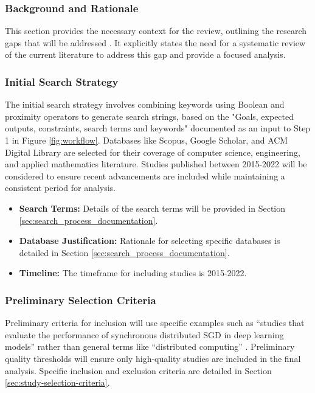 \subsubsection{Background and Rationale}
This section provides the necessary context for the review, outlining the research gaps that will
be addressed \cite{ben-nun_demystifying_2020}. It explicitly states the need for a systematic
review of the current literature to address this gap and provide a focused analysis.

\subsubsection{Initial Search Strategy}
The initial search strategy involves combining keywords using Boolean and proximity operators to
generate search strings, based on the "Goals, expected outputs, constraints, search terms and
keywords" documented as an input to Step 1 in Figure \ref{fig:workflow}. Databases like Scopus,
Google Scholar, and ACM Digital Library are selected for their coverage of computer science,
engineering, and applied mathematics literature. Studies published between 2015-2022 will be
considered to ensure recent advancements are included while maintaining a consistent period for
analysis.
\begin{itemize}
	\item \textbf{Search Terms:} Details of the search terms will be provided in Section \ref{sec:search_process_documentation}.
	\item \textbf{Database Justification:} Rationale for selecting specific databases is detailed in Section \ref{sec:search_process_documentation}.
	\item \textbf{Timeline:} The timeframe for including studies is 2015-2022.
\end{itemize}

\subsubsection{Preliminary Selection Criteria}
Preliminary criteria for inclusion will use specific examples such as ``studies that evaluate the
performance of synchronous distributed SGD in deep learning models'' rather than general terms like
``distributed computing'' \cite{ben-nun_demystifying_2020}. Preliminary quality thresholds will
ensure only high-quality studies are included in the final analysis. Specific inclusion and
exclusion criteria are detailed in Section \ref{sec:study-selection-criteria}.

